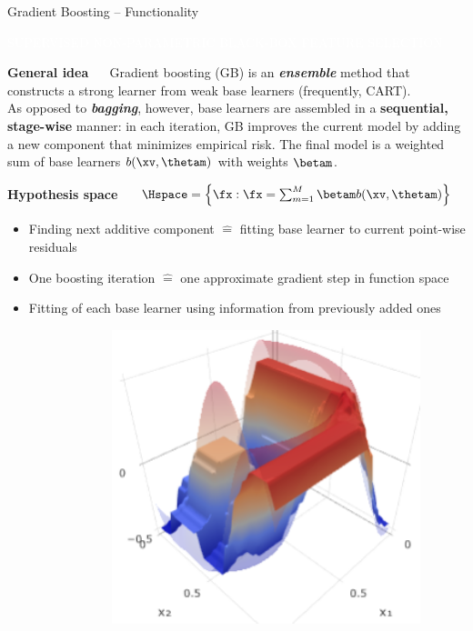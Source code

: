 \documentclass[11pt,compress,t,notes=noshow, xcolor=table]{beamer}
\newcommand{\maketag}[1]{\colorbox{highlightcol}{\textcolor{white}
{\MakeUppercase{#1}}}}
\newcommand{\highlight}[1]{\textcolor{highlightcol}{\textbf{#1}}}
\newcommand{\bfit}[1]{\textbf{\textit{#1}}}
\begin{document}
\begin{frame}{Gradient Boosting -- Functionality}

\vspace{0.3cm}

\footnotesize

\maketag{SUPERVISED}
\maketag{NON-PARAMETRIC}
\maketag{BLACK-BOX}
\maketag{FEATURE SELECTION}

\medskip

\highlight{General idea} ~~ Gradient boosting (GB) is an
\bfit{ensemble} method that constructs a strong learner from weak 
base learners (frequently, CART). \\
As opposed to \bfit{bagging}, however, base learners are assembled
in a \textbf{sequential, stage-wise} manner: in each iteration, GB improves the 
current model by adding a new component that minimizes empirical risk. The final 
model is a weighted sum of base learners $b(\xv, \thetam)$ with weights 
$\betam$.

\medskip

\highlight{Hypothesis space} ~~
$\Hspace = \left\{ \fx: \fx = \sum_{m = 1}^M \betam b(\xv, \thetam) \right\}$

\medskip

\begin{minipage}{0.6\textwidth}
  \begin{itemize}
    \item Finding next additive component $\widehat{=}$ fitting base learner
    to current point-wise residuals  
    \item One boosting iteration $\widehat{=}$ one approximate gradient step in 
    function space
    \item Fitting of each base learner using information from previously
    added ones
  \end{itemize}
\end{minipage}%
\begin{minipage}{0.4\textwidth}
  \includegraphics[width=0.9\textwidth]{figure/gb_3d.PNG}
\end{minipage}

\end{frame}
\end{document}
